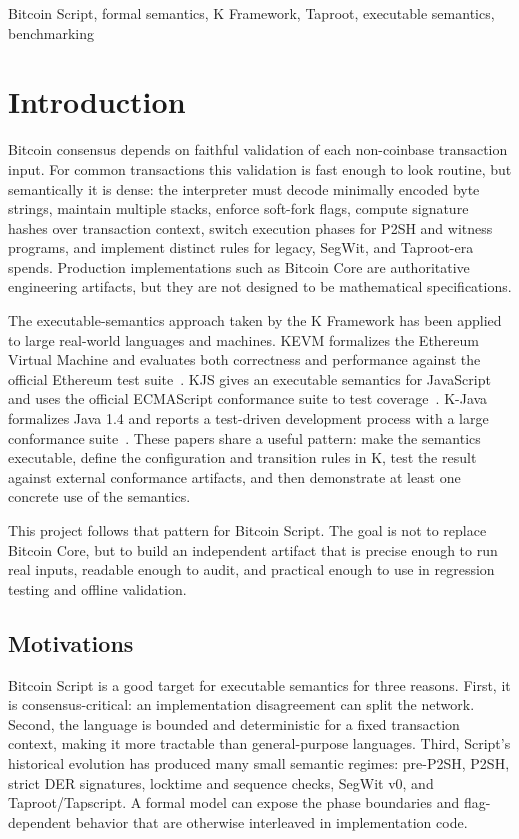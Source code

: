 \documentclass[conference]{IEEEtran}
\newcommand{\kframework}{K Framework\xspace}
\newcommand{\bitcoin}{Bitcoin\xspace}
\begin{document}
\begin{IEEEkeywords}
Bitcoin Script, formal semantics, K Framework, Taproot, executable semantics,
benchmarking
\end{IEEEkeywords}

\section{Introduction}

\bitcoin consensus depends on faithful validation of each non-coinbase
transaction input.  For common transactions this validation is fast enough to
look routine, but semantically it is dense: the interpreter must decode
minimally encoded byte strings, maintain multiple stacks, enforce soft-fork
flags, compute signature hashes over transaction context, switch execution
phases for P2SH and witness programs, and implement distinct rules for legacy,
SegWit, and Taproot-era spends.  Production implementations such as Bitcoin
Core are authoritative engineering artifacts, but they are not designed to be
mathematical specifications.

The executable-semantics approach taken by the \kframework has been applied to
large real-world languages and machines.  KEVM formalizes the Ethereum Virtual
Machine and evaluates both correctness and performance against the official
Ethereum test suite~\cite{kevm}.  KJS gives an executable semantics for
JavaScript and uses the official ECMAScript conformance suite to test
coverage~\cite{kjs}.  K-Java formalizes Java 1.4 and reports a test-driven
development process with a large conformance suite~\cite{kjava}.  These papers
share a useful pattern: make the semantics executable, define the configuration
and transition rules in K, test the result against external conformance
artifacts, and then demonstrate at least one concrete use of the semantics.

This project follows that pattern for \bitcoin Script.  The goal is not to
replace Bitcoin Core, but to build an independent artifact that is precise
enough to run real inputs, readable enough to audit, and practical enough to
use in regression testing and offline validation.

\subsection{Motivations}

\bitcoin Script is a good target for executable semantics for three reasons.
First, it is consensus-critical: an implementation disagreement can split the
network.  Second, the language is bounded and deterministic for a fixed
transaction context, making it more tractable than general-purpose languages.
Third, Script's historical evolution has produced many small semantic regimes:
pre-P2SH, P2SH, strict DER signatures, locktime and sequence checks, SegWit v0,
and Taproot/Tapscript.  A formal model can expose the phase boundaries and
flag-dependent behavior that are otherwise interleaved in implementation code.
\end{document}
